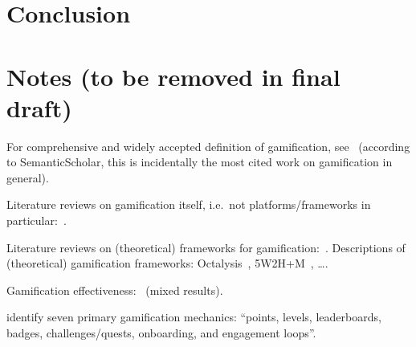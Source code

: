 \documentclass[runningheads]{llncs}
\begin{document}
\begin{landscape}
\begin{table}[p]
\end{table}
\end{landscape}
\restoregeometry%

\section{Conclusion}

\appendix

\section{Notes (to be removed in final draft)}

For comprehensive and widely accepted definition of gamification, see~\cite{DeDKN11} (according to SemanticScholar, this is incidentally the most cited work on gamification in general).

Literature reviews on gamification itself, i.e.\ not platforms/frameworks in particular:~\cite{Herz14, HaKS14}.

Literature reviews on (theoretical) frameworks for gamification:~\cite{MRGA15, MRGA17}. Descriptions of (theoretical) gamification frameworks: Octalysis~\cite{Chou15}, 5W2H+M~\cite{CoGS19, CoGS19a}, \ldots.

Gamification effectiveness:~\cite{SaHMM17, APLLAC24} (mixed results).

\cite{ZichC11} identify seven primary gamification mechanics: \enquote{points, levels, leaderboards, badges,  challenges/quests, onboarding, and engagement loops}.

\printbibliography[
    notkeyword=framework
]

\newrefcontext[labelprefix=F]
\printbibliography[
    keyword=framework,
    title={Frameworks}
]
\end{document}
